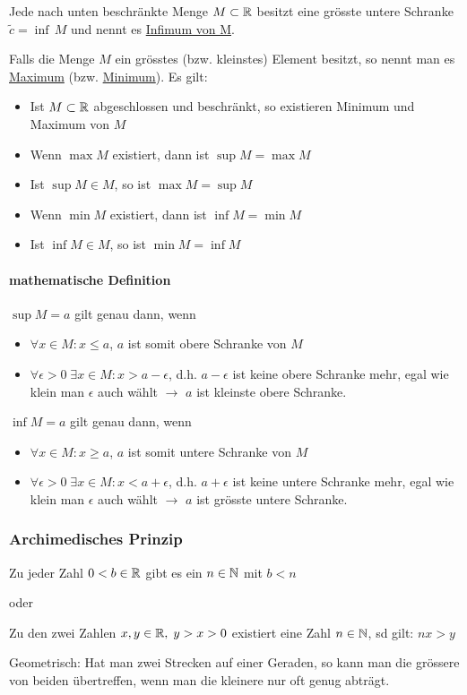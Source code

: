 Jede nach unten beschränkte Menge $M \subset \mathbb{R}$ besitzt eine grösste untere Schranke $\tilde{c} = \inf \, M$ und nennt es \underline{Infimum von M}.


Falls die Menge $M$ ein grösstes (bzw. kleinstes) Element besitzt, so nennt man es \underline{Maximum} (bzw. \underline{Minimum}).
Es gilt:
\begin{itemize}
	\item Ist $M \subset \mathbb{R}$ abgeschlossen und beschränkt, so existieren Minimum und Maximum von $M$
	\item Wenn $\max M$ existiert, dann ist $\sup M = \max M$
	\item Ist $\sup M \in M$, so ist $\max M = \sup M$
	\item Wenn $\min M$ existiert, dann ist $\inf M = \min M$
	\item Ist $\inf M \in M$, so ist $\min M = \inf M$
\end{itemize}

\paragraph{mathematische Definition}
$\sup M = a$ gilt genau dann, wenn
\begin{itemize}
	\item $\forall x \in M: x \leq a$, $a$ ist somit obere Schranke von $M$
	\item $\forall \epsilon > 0 \; \exists x \in M: x > a - \epsilon$, d.h. $a - \epsilon$ ist keine obere Schranke mehr, egal wie klein man $\epsilon$ auch wählt $\rightarrow$ $a$ ist kleinste obere Schranke.
\end{itemize}

$\inf M = a$ gilt genau dann, wenn
\begin{itemize}
	\item $\forall x \in M: x \geq a$, $a$ ist somit untere Schranke von $M$
	\item $\forall \epsilon > 0 \; \exists x \in M: x < a + \epsilon$, d.h. $a + \epsilon$ ist keine untere Schranke mehr, egal wie klein man $\epsilon$ auch wählt $\rightarrow$ $a$ ist grösste untere Schranke.
\end{itemize}

\subsubsection{Archimedisches Prinzip}
\begin{satz}
Zu jeder Zahl $0 < b \in \mathbb{R}$ gibt es ein $n \in \mathbb{N}$ mit $b < n$
\end{satz}

oder

\begin{satz}
Zu den zwei Zahlen $x, y \in \mathbb{R}, \; y > x > 0$ existiert eine Zahl $n \in \mathbb{N}$, sd gilt: $nx > y$
\end{satz}

Geometrisch: Hat man zwei Strecken auf einer Geraden, so kann man die grössere von beiden übertreffen, wenn man die kleinere nur oft genug abträgt.
